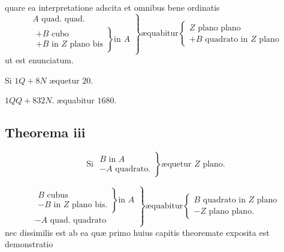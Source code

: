 \documentclass[11pt,a4paper]{article}
\begin{document}

quare ea interpretatione adscita et omnibus bene ordinatis
\[ \left.\begin{array}{l} A \text{ quad. quad.} \\ \left.\begin{array}{l} + B \text{ cubo} \\ + B \text{ in } Z \text{ plano bis} \end{array}\right\} \text{in } A \end{array}\right\} \text{æquabitur} \left\{\begin{array}{l} Z \text{ plano plano} \\ + B \text{ quadrato in } Z \text{ plano} \end{array}\right. \]
ut est enunciatum.

Si $1Q + 8N$ æquetur $20$.

$1QQ + 832N$. æquabitur $1680$.


\subsection*{Theorema iii}

\[ \text{Si } \left.\begin{array}{l} B \text{ in } A \\ - A \text{ quadrato.} \end{array}\right\} \text{æquetur } Z \text{ plano.} \]

\[ \left.\begin{array}{l} \left.\begin{array}{l} B \text{ cubus} \\ - B \text{ in } Z \text{ plano bis.} \end{array}\right\} \text{in } A \\ - A \text{ quad. quadrato} \end{array}\right\} \text{æquabitur} \left\{\begin{array}{l} B \text{ quadrato in } Z \text{ plano} \\ - Z \text{ plano plano.} \end{array}\right. \]
nec dissimilis est ab ea quæ primo huius capitis theoremate exposita est demonstratio
\end{document}
